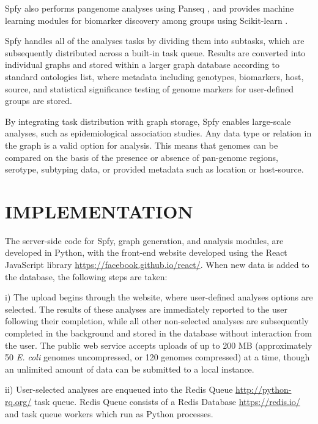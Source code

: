 \documentclass{article}
\begin{document}
Spfy also performs pangenome analyses using Panseq \cite{laing2010pan}, and provides machine learning modules for biomarker discovery among groups using Scikit-learn \cite{pedregosa2011scikit}.

Spfy handles all of the analyses tasks by dividing them into subtasks, which are subsequently distributed across a built-in task queue. Results are converted into individual graphs and stored within a larger graph database according to standard ontologies {list}, where metadata including genotypes, biomarkers, host, source, and statistical significance testing of genome markers for user-defined groups are stored.

By integrating task distribution with graph storage, Spfy enables large-scale analyses, such as epidemiological association studies. Any data type or relation in the graph is a valid option for analysis. This means that genomes can be compared on the basis of the presence or absence of pan-genome regions, serotype, subtyping data, or provided metadata such as location or host-source.


\section{IMPLEMENTATION}
The server-side code for Spfy, graph generation, and analysis modules, are developed in Python, with the front-end website developed using the React JavaScript library \url{https://facebook.github.io/react/}. When new data is added to the database, the following steps are taken:

i) The upload begins through the website, where user-defined analyses options are selected. The results of these analyses are immediately reported to the user following their completion, while all other non-selected analyses are subsequently completed in the background and stored in the database without interaction from the user. The public web service accepts uploads of up to 200 MB (approximately 50 \textit {E. coli} genomes uncompressed, or 120 genomes compressed) at a time, though an unlimited amount of data can be submitted to a local instance.

ii) User-selected analyses are enqueued into the Redis Queue \url{http://python-rq.org/} task queue. Redis Queue consists of a Redis Database \url{https://redis.io/} and task queue workers which run as Python processes.
\end{document}
